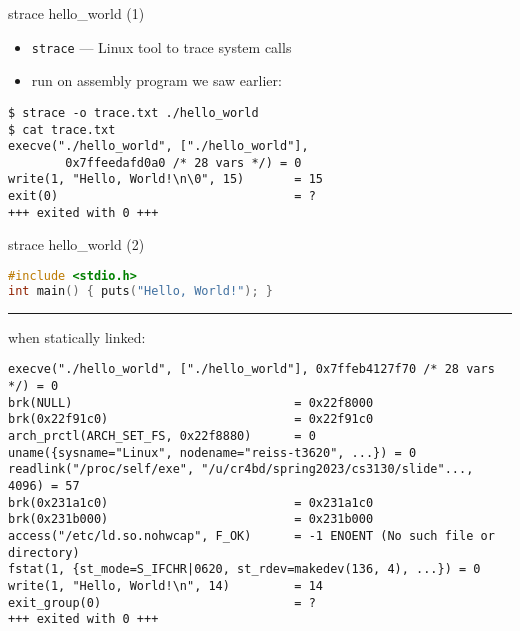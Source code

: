 \begin{frame}[fragile]{strace hello\_world (1)}
\begin{itemize}
\item \texttt{strace} --- Linux tool to trace system calls
\item run on assembly program we saw earlier:
\end{itemize}
\begin{Verbatim}[fontsize=\small]
$ strace -o trace.txt ./hello_world
$ cat trace.txt
execve("./hello_world", ["./hello_world"],
        0x7ffeedafd0a0 /* 28 vars */) = 0
write(1, "Hello, World!\n\0", 15)       = 15
exit(0)                                 = ?
+++ exited with 0 +++
\end{Verbatim}
\end{frame}

\begin{frame}[fragile]{strace hello\_world (2)}
\begin{lstlisting}[language=C]
#include <stdio.h>
int main() { puts("Hello, World!"); }
\end{lstlisting}
\hrule
when statically linked:
\begin{Verbatim}[fontsize=\scriptsize]
execve("./hello_world", ["./hello_world"], 0x7ffeb4127f70 /* 28 vars */) = 0
brk(NULL)                               = 0x22f8000
brk(0x22f91c0)                          = 0x22f91c0
arch_prctl(ARCH_SET_FS, 0x22f8880)      = 0
uname({sysname="Linux", nodename="reiss-t3620", ...}) = 0
readlink("/proc/self/exe", "/u/cr4bd/spring2023/cs3130/slide"..., 4096) = 57
brk(0x231a1c0)                          = 0x231a1c0
brk(0x231b000)                          = 0x231b000
access("/etc/ld.so.nohwcap", F_OK)      = -1 ENOENT (No such file or directory)
fstat(1, {st_mode=S_IFCHR|0620, st_rdev=makedev(136, 4), ...}) = 0
write(1, "Hello, World!\n", 14)         = 14
exit_group(0)                           = ?
+++ exited with 0 +++
\end{Verbatim}
\end{frame}

